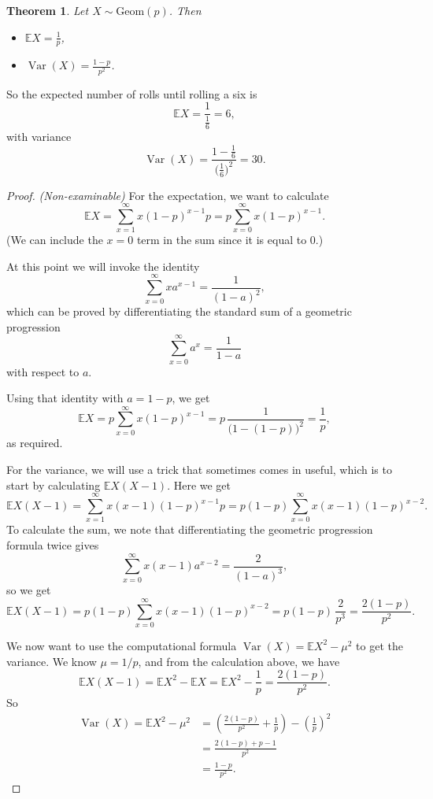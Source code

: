 \documentclass[
  a4paper,
]{book}
\providecommand{\tightlist}{%
  \setlength{\itemsep}{0pt}\setlength{\parskip}{0pt}}
\newtheorem{theorem}{Theorem}[chapter]
\theoremstyle{definition}
\theoremstyle{definition}
\theoremstyle{definition}
\theoremstyle{definition}
\theoremstyle{remark}
\begin{document}
\begin{theorem}

Let \(X \sim \text{Geom}(p)\). Then

\begin{itemize}
\tightlist
\item
  \(\mathbb EX = \displaystyle\frac1p\),
\item
  \(\operatorname{Var}(X) = \displaystyle\frac{1-p}{p^2}\).
\end{itemize}

\end{theorem}

So the expected number of rolls until rolling a six is
\[ \mathbb EX = \frac{1}{\frac16} = 6 , \]
with variance
\[ \operatorname{Var}(X) = \frac{1 - \frac16}{\big(\frac16\big)^2} = 30 . \]

\begin{proof}
\emph{(Non-examinable)}
For the expectation, we want to calculate
\[ \mathbb EX = \sum_{x=1}^\infty x (1-p)^{x-1} p = p \sum_{x=0}^\infty x (1-p)^{x-1}. \]
(We can include the \(x = 0\) term in the sum since it is equal to 0.)

At this point we will invoke the identity
\[ \sum_{x = 0}^\infty x a^{x-1} = \frac{1}{(1-a)^2} , \]
which can be proved by differentiating the standard sum of a geometric progression
\[ \sum_{x = 0}^\infty a^x = \frac{1}{1 - a} \]
with respect to \(a\).

Using that identity with \(a = 1-p\), we get
\[ \mathbb EX = p \sum_{x=0}^\infty x (1-p)^{x-1} = p\, \frac{1}{\big(1 - (1-p)\big)^2} = \frac{1}{p} , \]
as required.

For the variance, we will use a trick that sometimes comes in useful, which is to start by calculating \(\mathbb EX(X-1)\). Here we get
\[ \mathbb EX(X-1) = \sum_{x=1}^\infty x (x-1) (1-p)^{x-1} p = p(1-p) \sum_{x=0}^\infty x(x-1) (1-p)^{x-2} . \]
To calculate the sum, we note that differentiating the geometric progression formula twice gives
\[ \sum_{x = 0}^\infty x(x-1) a^{x-2} = \frac{2}{(1-a)^3} , \]
so we get
\[ \mathbb EX(X-1) = p(1-p) \sum_{x=0}^\infty x(x-1) (1-p)^{x-2} = p(1 -p) \, \frac{2}{p^3} = \frac{2(1-p)}{p^2} . \]

We now want to use the computational formula \(\operatorname{Var}(X) = \mathbb EX^2 - \mu^2\) to get the variance. We know \(\mu = 1/p\), and from the calculation above, we have
\[ \mathbb EX(X-1) = \mathbb EX^2 - \mathbb EX = \mathbb EX^2 - \frac{1}{p} = \frac{2(1-p)}{p^2} . \]
So
\begin{align*}
\operatorname{Var}(X) = \mathbb EX^2 - \mu^2
&= \left(\frac{2(1-p)}{p^2} + \frac{1}{p}\right) - \left(\frac{1}{p}\right)^2 \\
&= \frac{2(1-p) + p - 1}{p^2} \\
&= \frac{1-p}{p^2} .
\end{align*}
\end{proof}
\end{document}
